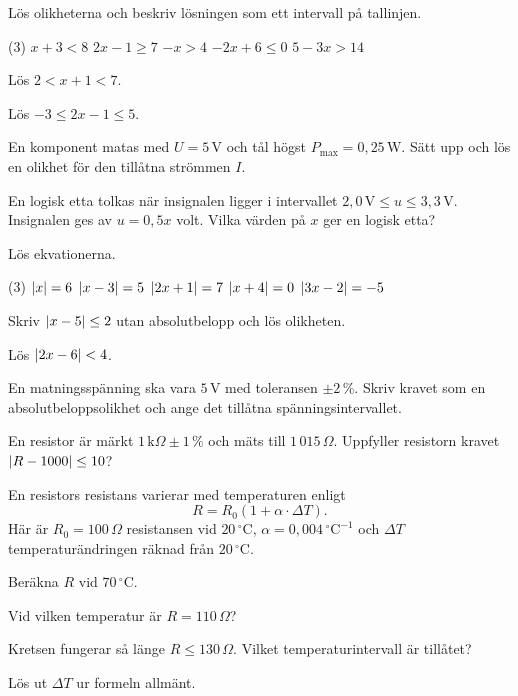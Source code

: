 Lös olikheterna och beskriv lösningen som ett intervall på tallinjen.
\begin{delar}(3)
  \task $x + 3 < 8$
  \task $2x - 1 \geq 7$
  \task $-x > 4$
  \task $-2x + 6 \leq 0$
  \task $5 - 3x > 14$
\end{delar}

\begin{parts}
  \item Lös $2 < x + 1 < 7$.
  \item Lös $-3 \leq 2x - 1 \leq 5$.
  \item En komponent matas med $U = 5\,\text{V}$ och tål högst $P_{\max} = 0{,}25\,\text{W}$.
    Sätt upp och lös en olikhet för den tillåtna strömmen $I$.
  \item En logisk etta tolkas när insignalen ligger i intervallet
    $2{,}0\,\text{V} \leq u \leq 3{,}3\,\text{V}$. Insignalen ges av $u = 0{,}5x$ volt. Vilka
    värden på $x$ ger en logisk etta?
\end{parts}

Lös ekvationerna.
\begin{delar}(3)
  \task $\lvert x\rvert = 6$
  \task $\lvert x - 3\rvert = 5$
  \task $\lvert2x + 1\rvert = 7$
  \task $\lvert x + 4\rvert = 0$
  \task $\lvert3x - 2\rvert = -5$
\end{delar}

\begin{parts}
  \item Skriv $\lvert x - 5\rvert \leq 2$ utan absolutbelopp och lös olikheten.
  \item Lös $\lvert2x - 6\rvert < 4$.
  \item En matningsspänning ska vara $5\,\text{V}$ med toleransen $\pm 2\,\%$. Skriv kravet som en
    absolut\-belopps\-olikhet och ange det tillåtna spänningsintervallet.
  \item En resistor är märkt $1\,\text{k}\Omega \pm 1\,\%$ och mäts till $1\,015\,\Omega$. Uppfyller
    resistorn kravet ${\lvert R - 1000\rvert \leq 10}$?
\end{parts}

En resistors resistans varierar med temperaturen enligt
\[
  R = R_0(1 + \alpha \cdot \Delta T).
\]
Här är $R_0 = 100\,\Omega$ resistansen vid $20\,{}^{\circ}\text{C}$,
$\alpha = 0{,}004\,{}^{\circ}\text{C}^{-1}$ och $\Delta T$ temperaturändringen räknad från
$20\,{}^{\circ}\text{C}$.
\begin{parts}
  \item Beräkna $R$ vid $70\,{}^{\circ}\text{C}$.
  \item Vid vilken temperatur är $R = 110\,\Omega$?
  \item Kretsen fungerar så länge $R \leq 130\,\Omega$. Vilket temperaturintervall är tillåtet?
  \item Lös ut $\Delta T$ ur formeln allmänt.
\end{parts}
